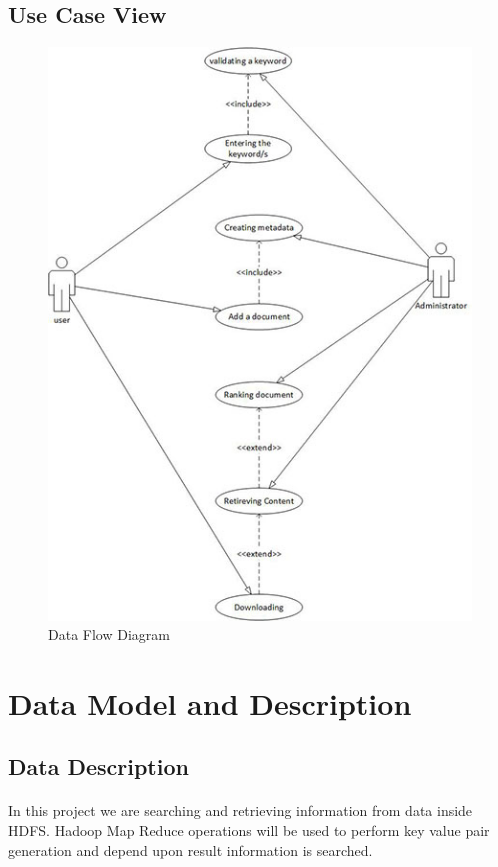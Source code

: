 \documentclass[oneside,a4paper,12pt]{report}
\begin{document}
\subsection{Use Case View}
\begin{figure}[H]
\includegraphics{use_case_diagram}
\caption{Data Flow Diagram}
\end{figure}


\section{Data Model and Description}

\subsection{Data Description}
\paragraph{}
In this project we are searching and retrieving information from data inside HDFS. Hadoop Map Reduce operations will be used to perform key value pair generation and depend upon result information is searched. 
\end{document}
